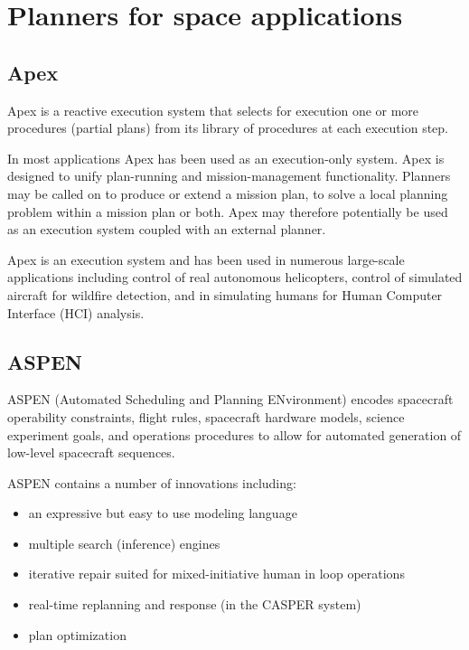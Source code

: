 \documentclass[conference]{IEEEtran}
\begin{document}
\section{Planners for space applications}

\subsection{\textbf{Apex}}\label{sec:apex}
 Apex is a reactive execution system that selects for execution one or more procedures (partial plans) from its library of procedures at each execution step. 


 In most applications Apex has been used as an execution-only system. Apex is designed to unify plan-running and mission-management functionality. Planners may be called on to produce or extend a mission plan, to solve a local planning problem within a mission plan or both. Apex may therefore potentially be used as an execution system coupled with an external planner.

 Apex is an execution system and has been used in numerous large-scale applications including control of real autonomous helicopters, control of simulated aircraft for wildfire detection, and in simulating humans for Human Computer Interface (HCI) analysis.

\subsection{\textbf{ASPEN}}\label{sec:aspen}
 ASPEN (Automated Scheduling and Planning ENvironment) encodes spacecraft operability constraints, flight rules, spacecraft hardware models, science experiment goals, and operations procedures to allow for automated generation of low-level spacecraft sequences. 

 ASPEN contains a number of innovations including: 
\begin{itemize}
  \item an expressive but easy to use modeling language
  \item multiple search (inference) engines
  \item iterative repair suited for mixed-initiative human in loop operations
  \item real-time replanning and response (in the CASPER system)
  \item plan optimization
\end{itemize}
 
\end{document}
